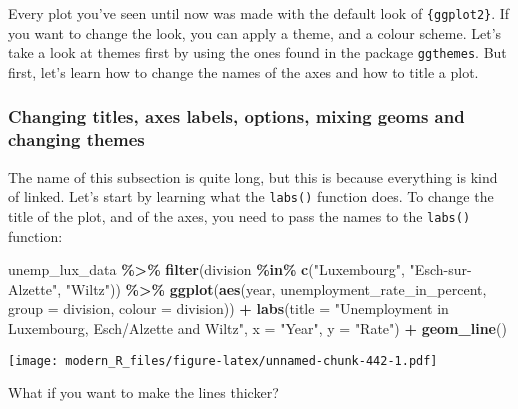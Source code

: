 \documentclass[
]{article}
\newenvironment{Shaded}{\begin{snugshade}}{\end{snugshade}}
\newcommand{\DataTypeTok}[1]{\textcolor[rgb]{0.13,0.29,0.53}{#1}}
\newcommand{\KeywordTok}[1]{\textcolor[rgb]{0.13,0.29,0.53}{\textbf{#1}}}
\newcommand{\NormalTok}[1]{#1}
\newcommand{\OperatorTok}[1]{\textcolor[rgb]{0.81,0.36,0.00}{\textbf{#1}}}
\newcommand{\StringTok}[1]{\textcolor[rgb]{0.31,0.60,0.02}{#1}}
\begin{document}
Every plot you've seen until now was made with the default look of \texttt{\{ggplot2\}}. If you want to change
the look, you can apply a theme, and a colour scheme. Let's take a look at themes first by using the
ones found in the package \texttt{ggthemes}. But first, let's learn how to change the names of the axes
and how to title a plot.

\hypertarget{changing-titles-axes-labels-options-mixing-geoms-and-changing-themes}{%
\subsubsection{Changing titles, axes labels, options, mixing geoms and changing themes}\label{changing-titles-axes-labels-options-mixing-geoms-and-changing-themes}}

The name of this subsection is quite long, but this is because everything is kind of linked. Let's
start by learning what the \texttt{labs()} function does. To change the title of the plot, and of the axes,
you need to pass the names to the \texttt{labs()} function:

\begin{Shaded}
\begin{Highlighting}[]
\NormalTok{unemp\_lux\_data }\OperatorTok{\%\textgreater{}\%}
\StringTok{  }\KeywordTok{filter}\NormalTok{(division }\OperatorTok{\%in\%}\StringTok{ }\KeywordTok{c}\NormalTok{(}\StringTok{"Luxembourg"}\NormalTok{, }\StringTok{"Esch{-}sur{-}Alzette"}\NormalTok{, }\StringTok{"Wiltz"}\NormalTok{)) }\OperatorTok{\%\textgreater{}\%}
\StringTok{  }\KeywordTok{ggplot}\NormalTok{(}\KeywordTok{aes}\NormalTok{(year, unemployment\_rate\_in\_percent, }\DataTypeTok{group =}\NormalTok{ division, }\DataTypeTok{colour =}\NormalTok{ division)) }\OperatorTok{+}
\StringTok{  }\KeywordTok{labs}\NormalTok{(}\DataTypeTok{title =} \StringTok{"Unemployment in Luxembourg, Esch/Alzette and Wiltz"}\NormalTok{, }\DataTypeTok{x =} \StringTok{"Year"}\NormalTok{, }\DataTypeTok{y =} \StringTok{"Rate"}\NormalTok{) }\OperatorTok{+}
\StringTok{  }\KeywordTok{geom\_line}\NormalTok{()}
\end{Highlighting}
\end{Shaded}

\texttt{[image: modern\_R\_files/figure-latex/unnamed-chunk-442-1.pdf]}

What if you want to make the lines thicker?
\end{document}
